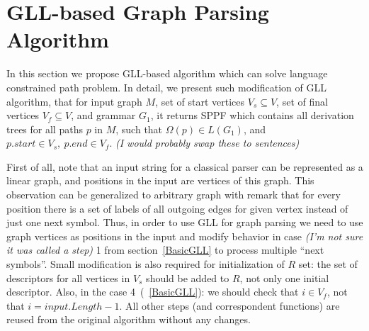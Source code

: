 \section{GLL-based Graph Parsing Algorithm}


In this section we propose GLL-based algorithm which can solve language constrained path problem.
In detail, we present such modification of GLL algorithm, that for input graph $M$, set of start vertices $V_s\subseteq V$, set of final vertices $V_f\subseteq V$, and grammar $G_1$, it returns SPPF which contains all derivation trees for all paths $p$ in $M$, such that $\Omega(p) \in L(G_1)$, and $p.start \in V_s,\ p.end \in V_f$.
\emph{(I would probably swap these to sentences)}

First of all, note that an input string for a classical parser can be represented as a linear graph, and positions in the input are vertices of this graph.
This observation can be generalized to arbitrary graph with remark that for every position there is a set of labels of all outgoing edges for given vertex instead of just one next symbol. 
Thus, in order to use GLL for graph parsing we need to use graph vertices as positions in the input and modify behavior in case \emph{(I'm not sure it was called a step)} 1 from section~\ref{BasicGLL} to process multiple ``next symbols''.
Small modification is also required for initialization of $R$ set: the set of descriptors for all vertices in $V_s$ should be added to $R$, not only one initial descriptor.
Also, in the case 4~(~\ref{BasicGLL}): we should check that $i \in V_f$, not that $i = input.Length - 1$.
All other steps (and correspondent functions) are reused from the original algorithm without any changes.

